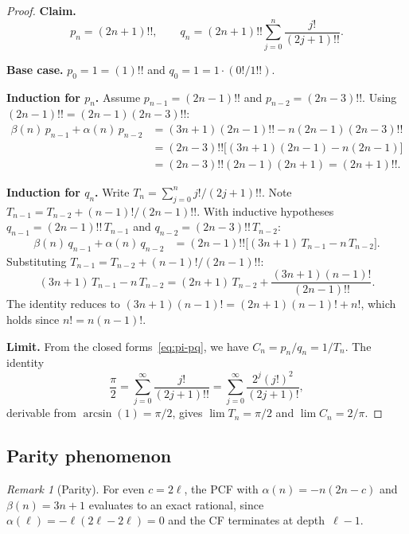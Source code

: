 \documentclass[11pt,a4paper]{article}
\theoremstyle{plain}
\theoremstyle{definition}
\theoremstyle{remark}
\newtheorem{remark}[theorem]{Remark}
\begin{document}
\begin{proof}
\textbf{Claim.}
\begin{equation}\label{eq:pi-pq}
  p_n = (2n{+}1)!!, \qquad
  q_n = (2n{+}1)!! \sum_{j=0}^{n} \frac{j!}{(2j{+}1)!!}.
\end{equation}

\textbf{Base case.}
$p_0 = 1 = (1)!!$ and $q_0 = 1 = 1\cdot(0!/1!!)$.

\medskip\noindent\textbf{Induction for $p_n$.}
Assume $p_{n-1} = (2n{-}1)!!$ and $p_{n-2} = (2n{-}3)!!$.
Using $(2n{-}1)!! = (2n{-}1)(2n{-}3)!!$:
\begin{align*}
  \beta(n)\,p_{n-1} + \alpha(n)\,p_{n-2}
  &= (3n{+}1)(2n{-}1)!! - n(2n{-}1)(2n{-}3)!! \\
  &= (2n{-}3)!!\bigl[(3n{+}1)(2n{-}1) - n(2n{-}1)\bigr] \\
  &= (2n{-}3)!!(2n{-}1)(2n{+}1) = (2n{+}1)!!.
\end{align*}

\medskip\noindent\textbf{Induction for $q_n$.}
Write $T_n = \sum_{j=0}^{n} j!/(2j{+}1)!!$.
Note $T_{n-1} = T_{n-2} + (n{-}1)!/(2n{-}1)!!$.
With inductive hypotheses
$q_{n-1} = (2n{-}1)!!\,T_{n-1}$ and $q_{n-2} = (2n{-}3)!!\,T_{n-2}$:
\begin{align*}
\beta(n)\,q_{n-1} + \alpha(n)\,q_{n-2}
&= (2n{-}1)!!\bigl[(3n{+}1)\,T_{n-1} - n\,T_{n-2}\bigr].
\end{align*}
Substituting $T_{n-1} = T_{n-2} + (n{-}1)!/(2n{-}1)!!$:
\[
  (3n{+}1)\,T_{n-1} - n\,T_{n-2}
  = (2n{+}1)\,T_{n-2} + \frac{(3n{+}1)(n{-}1)!}{(2n{-}1)!!}.
\]
The identity reduces to
$(3n{+}1)(n{-}1)! = (2n{+}1)(n{-}1)! + n!$,
which holds since $n! = n(n{-}1)!$.

\medskip\noindent\textbf{Limit.}
From the closed forms~\eqref{eq:pi-pq}, we have $C_n = p_n/q_n = 1/T_n$.
The identity \citep[\S5.2]{cuyt2008}
\begin{equation}\label{eq:pi-id}
  \frac{\pi}{2}
  = \sum_{j=0}^{\infty} \frac{j!}{(2j{+}1)!!}
  = \sum_{j=0}^{\infty} \frac{2^j(j!)^2}{(2j{+}1)!},
\end{equation}
derivable from $\arcsin(1) = \pi/2$,
gives $\lim T_n = \pi/2$ and $\lim C_n = 2/\pi$.
\end{proof}

\subsection{Parity phenomenon}\label{sec:parity}

\begin{remark}[Parity]\label{thm:parity}
For even $c = 2\ell$, the PCF with $\alpha(n) = -n(2n{-}c)$ and
$\beta(n) = 3n+1$ evaluates to an exact rational, since
$\alpha(\ell) = -\ell(2\ell - 2\ell) = 0$ and the CF terminates
at depth~$\ell{-}1$.
\end{remark}
\end{document}
